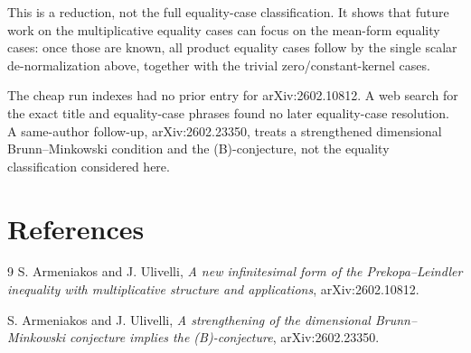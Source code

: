\documentclass[11pt]{article}
\begin{document}
This is a reduction, not the full equality-case classification.  It shows that
future work on the multiplicative equality cases can focus on the mean-form
equality cases: once those are known, all product equality cases follow by the
single scalar de-normalization above, together with the trivial
zero/constant-kernel cases.

The cheap run indexes had no prior entry for arXiv:2602.10812.  A web search
for the exact title and equality-case phrases found no later equality-case
resolution.  A same-author follow-up, arXiv:2602.23350, treats a strengthened
dimensional Brunn--Minkowski condition and the (B)-conjecture, not the equality
classification considered here.

\section*{References}

\begin{thebibliography}{9}
S. Armeniakos and J. Ulivelli,
\emph{A new infinitesimal form of the Prekopa--Leindler inequality with
multiplicative structure and applications},
arXiv:2602.10812.

S. Armeniakos and J. Ulivelli,
\emph{A strengthening of the dimensional Brunn--Minkowski conjecture implies
the (B)-conjecture},
arXiv:2602.23350.
\end{thebibliography}
\end{document}
